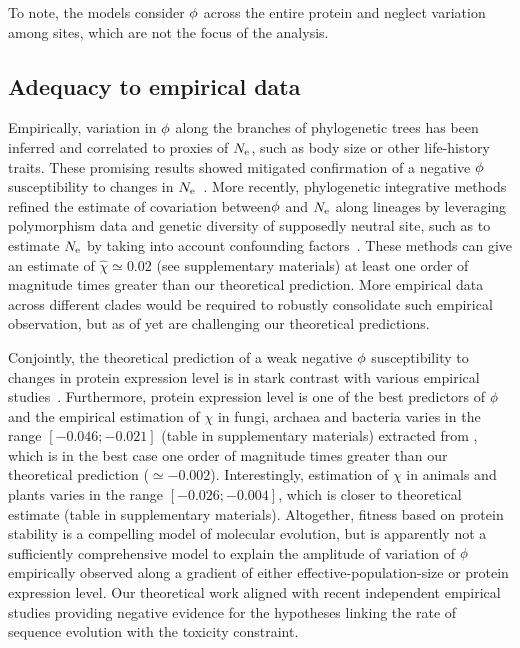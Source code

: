 To note, the models consider $\phi$ across the entire protein and neglect variation among sites, which are not the focus of the analysis.

\subsection{Adequacy to empirical data}
Empirically, variation in $\phi$ along the branches of phylogenetic trees has been inferred and correlated to proxies of $N_{\mathrm{e}}$, such as body size or other life-history traits.
These promising results showed mitigated confirmation of a negative $\phi$ susceptibility to changes in $N_{\mathrm{e}}$~\citep{Lanfear2014}.
More recently, phylogenetic integrative methods refined the estimate of covariation between$\phi$ and $N_{\mathrm{e}}$ along lineages by leveraging polymorphism data and genetic diversity of supposedly \gls{neutral} site, such as to estimate $N_{\mathrm{e}}$ by taking into account confounding factors~\citep{Brevet2019}.
These methods can give an estimate of $\hat{\chi} \simeq 0.02$ (see supplementary materials) at least one order of magnitude times greater than our theoretical prediction.
More empirical data across different clades would be required to robustly consolidate such empirical observation, but as of yet are challenging our theoretical predictions.

Conjointly, the theoretical prediction of a weak negative $\phi$ susceptibility to changes in protein expression level is in stark contrast with various empirical studies~\citep{Duret2000, Rocha2004, Wang2011, Song2017}.
Furthermore, protein expression level is one of the best predictors of $\phi$ and the empirical estimation of $\chi$ in fungi, archaea and bacteria varies in the range $[-0.046;-0.021]$ (table in supplementary materials) extracted from \citet{Zhang2015}, which is in the best case one order of magnitude times greater than our theoretical prediction ($\simeq -0.002$).
Interestingly, estimation of $\chi$ in animals and plants varies in the range $[-0.026;-0.004]$, which is closer to theoretical estimate (table in supplementary materials).
Altogether, fitness based on protein stability is a compelling model of molecular evolution, but is apparently not a sufficiently comprehensive model to explain the amplitude of variation of $\phi$ empirically observed along a gradient of either \gls{effective-population-size} or protein expression level.
Our theoretical work aligned with recent independent empirical studies providing negative evidence for the hypotheses linking the rate of sequence evolution with the toxicity constraint\citep{Plata2017,Razban2019,Biesiadecka2020}.

